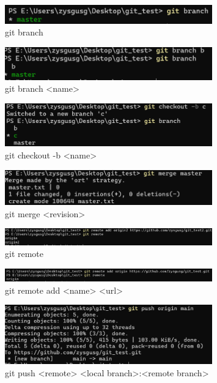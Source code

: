 \documentclass[UTF8]{ctexart}
\begin{document}
\begin{figure}[htbp]
    \centering
    \includegraphics[width=0.8\textwidth]{9.png} 
    \caption{git branch}
\end{figure}
\begin{figure}[htbp]
    \centering
    \includegraphics[width=0.8\textwidth]{10.png} 
    \caption{git branch <name>}
\end{figure}
\begin{figure}[htbp]
    \centering
    \includegraphics[width=0.8\textwidth]{11.png} 
    \caption{git checkout -b <name>}
\end{figure}
\begin{figure}[htbp]
    \centering
    \includegraphics[width=0.8\textwidth]{12.png} 
    \caption{git merge <revision>}
\end{figure}
\begin{figure}[htbp]
    \centering
    \includegraphics[width=0.8\textwidth]{13.png} 
    \caption{git remote}
\end{figure}
\begin{figure}[htbp]
    \centering
    \includegraphics[width=0.8\textwidth]{14.png} 
    \caption{{git remote add <name> <url>}}
\end{figure}
\begin{figure}[htbp]
    \centering
    \includegraphics[width=0.8\textwidth]{15.png} 
    \caption{git push <remote> <local branch>:<remote branch>}
\end{figure}
\end{document}
